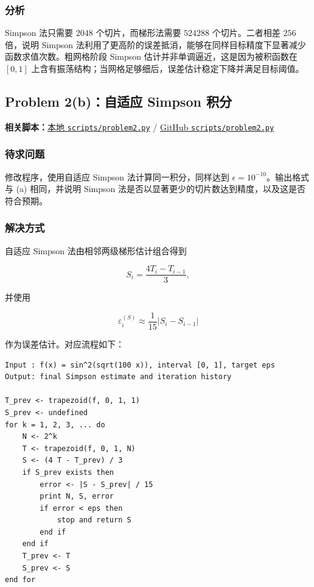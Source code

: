 \documentclass[12pt,a4paper,fontset=none]{ctexart}
\newcommand{\fileinline}[1]{{\urlstyle{same}\nolinkurl{#1}}}
\newcommand{\metadataline}[1]{#1}
\newcommand{\scriptpath}[1]{\fileinline{#1}}
\newcommand{\githubscriptsbase}{https://github.com/Void0312Aurora/computational-physics-homework-2026/blob/main/07/scripts}
\newcommand{\scriptlink}[1]{\noindent\metadataline{\textbf{相关脚本：}\href{../../../scripts/#1}{本地 \scriptpath{scripts/#1}} / \href{\githubscriptsbase/#1}{GitHub \scriptpath{scripts/#1}}}\par\medskip}
\begin{document}
\subsubsection{分析}\label{ux5206ux6790-2}

Simpson 法只需要 \(2048\) 个切片，而梯形法需要 \(524288\) 个切片。二者相差 \(256\) 倍，说明 Simpson 法利用了更高阶的误差抵消，能够在同样目标精度下显著减少函数求值次数。粗网格阶段 Simpson 估计并非单调逼近，这是因为被积函数在 \([0,1]\) 上含有振荡结构；当网格足够细后，误差估计稳定下降并满足目标阈值。

\subsection{Problem 2(b)：自适应 Simpson 积分}\label{problem-2b}

\scriptlink{problem2.py}

\subsubsection{待求问题}\label{ux5f85ux6c42ux95eeux9898-3}

修改程序，使用自适应 Simpson 法计算同一积分，同样达到 \(\epsilon=10^{-10}\)。输出格式与 (a) 相同，并说明 Simpson 法是否以显著更少的切片数达到精度，以及这是否符合预期。

\subsubsection{解决方式}\label{ux89e3ux51b3ux65b9ux5f0f-3}

自适应 Simpson 法由相邻两级梯形估计组合得到

\[
S_i=\frac{4T_i-T_{i-1}}{3},
\]

并使用

\[
\varepsilon_i^{(S)}\approx \frac{1}{15}|S_i-S_{i-1}|
\]

作为误差估计。对应流程如下：

\begin{verbatim}
Input : f(x) = sin^2(sqrt(100 x)), interval [0, 1], target eps
Output: final Simpson estimate and iteration history

T_prev <- trapezoid(f, 0, 1, 1)
S_prev <- undefined
for k = 1, 2, 3, ... do
    N <- 2^k
    T <- trapezoid(f, 0, 1, N)
    S <- (4 T - T_prev) / 3
    if S_prev exists then
        error <- |S - S_prev| / 15
        print N, S, error
        if error < eps then
            stop and return S
        end if
    end if
    T_prev <- T
    S_prev <- S
end for
\end{verbatim}
\end{document}
